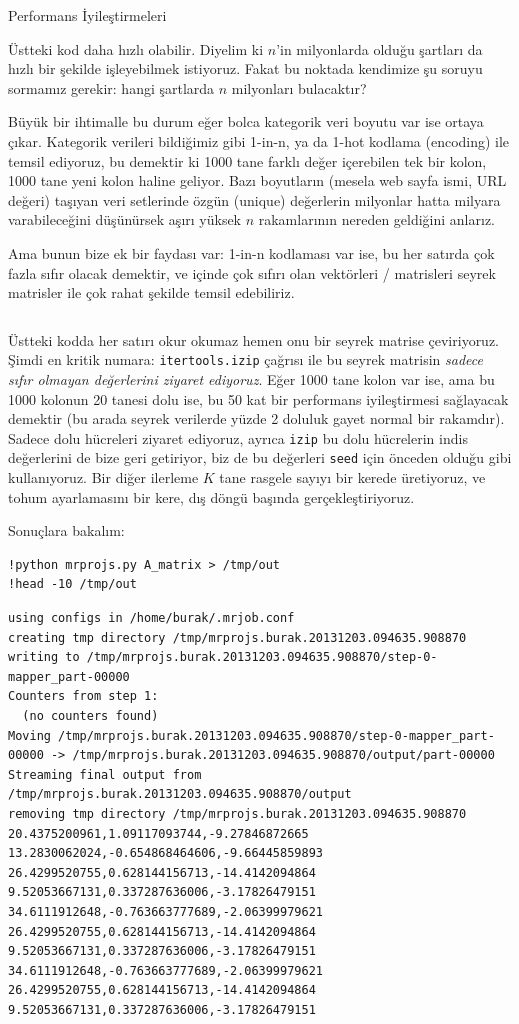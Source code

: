 \documentclass[12pt,fleqn]{article}\usepackage{../../common}
\begin{document}
Performans İyileştirmeleri

Üstteki kod daha hızlı olabilir. Diyelim ki $n$'in milyonlarda olduğu
şartları da hızlı bir şekilde işleyebilmek istiyoruz. Fakat bu noktada
kendimize şu soruyu sormamız gerekir: hangi şartlarda $n$ milyonları
bulacaktır?

Büyük bir ihtimalle bu durum eğer bolca kategorik veri boyutu var ise
ortaya çıkar. Kategorik verileri bildiğimiz gibi 1-in-n, ya da 1-hot
kodlama (encoding) ile temsil ediyoruz, bu demektir ki 1000 tane
farklı değer içerebilen tek bir kolon, 1000 tane yeni kolon haline
geliyor. Bazı boyutların (mesela web sayfa ismi, URL değeri) taşıyan
veri setlerinde özgün (unique) değerlerin milyonlar hatta milyara
varabileceğini düşünürsek aşırı yüksek $n$ rakamlarının nereden
geldiğini anlarız.

Ama bunun bize ek bir faydası var: 1-in-n kodlaması var ise, bu her
satırda çok fazla sıfır olacak demektir, ve içinde çok sıfırı olan
vektörleri / matrisleri seyrek matrisler ile çok rahat şekilde temsil
edebiliriz.

\inputminted[fontsize=\footnotesize]{python}{mrprojs.py}

Üstteki kodda her satırı okur okumaz hemen onu bir seyrek matrise
çeviriyoruz. Şimdi en kritik numara: \verb!itertools.izip!
çağrısı ile bu seyrek matrisin {\em sadece sıfır olmayan değerlerini
ziyaret ediyoruz}. Eğer 1000 tane kolon var ise, ama bu 1000
kolonun 20 tanesi dolu ise, bu 50 kat bir performans iyileştirmesi
sağlayacak demektir (bu arada seyrek verilerde yüzde 2 doluluk gayet
normal bir rakamdır). Sadece dolu hücreleri ziyaret ediyoruz, ayrıca
\verb!izip! bu dolu hücrelerin indis değerlerini de bize geri
getiriyor, biz de bu değerleri \verb!seed! için önceden olduğu
gibi kullanıyoruz. Bir diğer ilerleme $K$ tane rasgele sayıyı bir
kerede üretiyoruz, ve tohum ayarlamasını bir kere, dış döngü başında
gerçekleştiriyoruz. 

Sonuçlara bakalım:

\begin{verbatim}
!python mrprojs.py A_matrix > /tmp/out
!head -10 /tmp/out
\end{verbatim}

\begin{verbatim}
using configs in /home/burak/.mrjob.conf
creating tmp directory /tmp/mrprojs.burak.20131203.094635.908870
writing to /tmp/mrprojs.burak.20131203.094635.908870/step-0-mapper_part-00000
Counters from step 1:
  (no counters found)
Moving /tmp/mrprojs.burak.20131203.094635.908870/step-0-mapper_part-00000 -> /tmp/mrprojs.burak.20131203.094635.908870/output/part-00000
Streaming final output from /tmp/mrprojs.burak.20131203.094635.908870/output
removing tmp directory /tmp/mrprojs.burak.20131203.094635.908870
20.4375200961,1.09117093744,-9.27846872665
13.2830062024,-0.654868464606,-9.66445859893
26.4299520755,0.628144156713,-14.4142094864
9.52053667131,0.337287636006,-3.17826479151
34.6111912648,-0.763663777689,-2.06399979621
26.4299520755,0.628144156713,-14.4142094864
9.52053667131,0.337287636006,-3.17826479151
34.6111912648,-0.763663777689,-2.06399979621
26.4299520755,0.628144156713,-14.4142094864
9.52053667131,0.337287636006,-3.17826479151
\end{verbatim}
\end{document}
